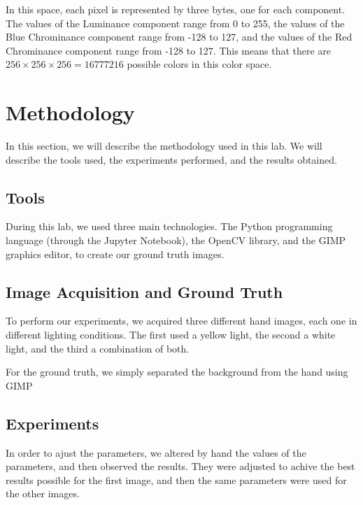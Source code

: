 \documentclass[journal]{IEEEtran}
\begin{document}
In this space, each pixel is represented by three bytes, one for each component. The values of the Luminance component range from 0 to 255, the values of the Blue Chrominance component range from -128 to 127, and the values of the Red Chrominance component range from -128 to 127. This means that there are $256 \times 256 \times 256 = 16777216$ possible colors in this color space.

\section{Methodology}

In this section, we will describe the methodology used in this lab. We will describe the tools used, the experiments performed, and the results obtained.

\subsection{Tools}

During this lab, we used three main technologies. The Python programming language (through the Jupyter Notebook), the OpenCV library, and the GIMP graphics editor, to create our ground truth images.

\subsection{Image Acquisition and Ground Truth}

To perform our experiments, we acquired three different hand images, each one in different lighting conditions. The first used a yellow light, the second a white light, and the third a combination of both.

For the ground truth, we simply separated the background from the hand using GIMP

\subsection{Experiments}
In order to ajust the parameters, we altered by hand the values of the parameters, and then observed the results. They were adjusted to achive the best results possible for the first image, and then the same parameters were used for the other images.
\end{document}
